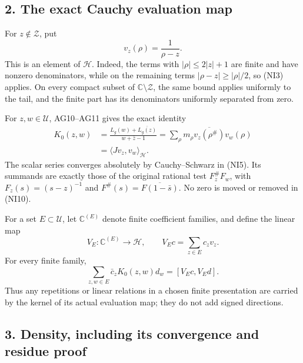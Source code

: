 \documentclass[
  10pt,
  a4paper,
]{article}
\begin{document}
\subsection{2. The exact Cauchy evaluation
map}\label{the-exact-cauchy-evaluation-map}

For \(z\notin\mathcal Z\), put \[
v_z(\rho)=\frac1{\rho-z}.
\tag{NI9}
\] This is an element of \(\mathcal H\). Indeed, the terms with
\(|\rho|\le2|z|+1\) are finite and have nonzero denominators, while on
the remaining terms \(|\rho-z|\ge|\rho|/2\), so (NI3) applies. On every
compact subset of \(\mathbb C\setminus\mathcal Z\), the same bound
applies uniformly to the tail, and the finite part has its denominators
uniformly separated from zero.

For \(z,w\in\mathcal U\), AG10--AG11 gives the exact identity \[
\begin{aligned}
K_0(z,w)
&=\frac{L_g(w)+\overline{L_g(z)}}{w+\bar z-1}
=\sum_\rho m_\rho\overline{v_z(\rho^\#)}v_w(\rho)\\
&=\langle Jv_z,v_w\rangle_{\mathcal H}.
\end{aligned}
\tag{NI10}
\] The scalar series converges absolutely by Cauchy--Schwarz in (NI5).
Its summands are exactly those of the original rational test
\(F_z^\#F_w\), with \(F_z(s)=(s-z)^{-1}\) and
\(F^\#(s)=\overline{F(1-\bar s)}\). No zero is moved or removed in
(NI10).

For a set \(E\subset\mathcal U\), let \(\mathbb C^{(E)}\) denote finite
coefficient families, and define the linear map \[
V_E:\mathbb C^{(E)}\longrightarrow\mathcal H,
\qquad V_Ec=\sum_{z\in E}c_zv_z.
\tag{NI11}
\] For every finite family, \[
\sum_{z,w\in E}\bar c_zK_0(z,w)d_w
=[V_Ec,V_Ed].
\tag{NI12}
\] Thus any repetitions or linear relations in a chosen finite
presentation are carried by the kernel of its actual evaluation map;
they do not add signed directions.

\subsection{3. Density, including its convergence and residue
proof}\label{density-including-its-convergence-and-residue-proof}
\end{document}
